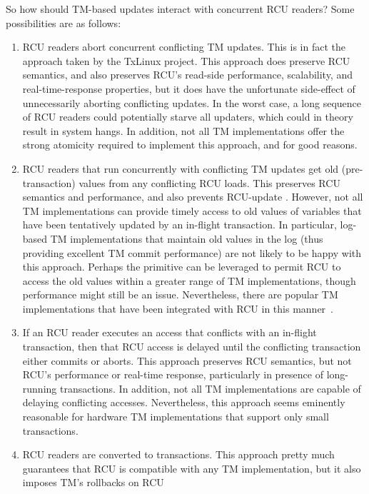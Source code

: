 So how should TM-based updates interact with concurrent RCU readers?
Some possibilities are as follows:

\begin{enumerate}
\item	RCU readers abort concurrent conflicting TM updates.
	This is in fact the approach taken by the TxLinux project.
	This approach does preserve RCU semantics, and also preserves
	RCU's read-side performance, scalability, and real-time-response
	properties, but it does have the unfortunate side-effect of
	unnecessarily aborting conflicting updates.
	In the worst case, a long sequence of RCU readers could
	potentially starve all updaters, which could in theory result
	in system hangs.
	In addition, not all TM implementations offer the strong atomicity
	required to implement this approach, and for good reasons.
\item	RCU readers that run concurrently with conflicting TM updates
	get old (pre-transaction) values from any conflicting RCU loads.
	This preserves RCU semantics and performance, and also prevents
	RCU-update .
	However, not all TM implementations can provide timely access
	to old values of variables that have been tentatively updated
	by an in-flight transaction.
	In particular, log-based TM implementations that maintain
	old values in the log (thus providing excellent TM commit
	performance) are not likely to be happy with this approach.
	Perhaps the  primitive can be leveraged
	to permit RCU to access the old values within a greater range
	of TM implementations, though performance might still be an issue.
	Nevertheless, there are popular TM implementations that have
	been integrated with RCU in this
	manner~\cite{DonaldEPorter2007TRANSACT,PhilHoward2011RCUTMRBTree,
	PhilipWHoward2013RCUrbtree}.
\item	If an RCU reader executes an access that conflicts with an
	in-flight transaction, then that RCU access is delayed until
	the conflicting transaction either commits or aborts.
	This approach preserves RCU semantics, but not RCU's performance
	or real-time response, particularly in presence of long-running
	transactions.
	In addition, not all TM implementations are capable of delaying
	conflicting accesses.
	Nevertheless, this approach seems eminently reasonable for hardware
	TM implementations that support only small transactions.
\item	RCU readers are converted to transactions.
	This approach pretty much guarantees that RCU is compatible with
	any TM implementation, but it also imposes TM's rollbacks on RCU

\end{enumerate}
